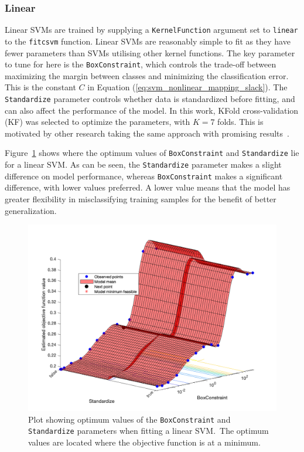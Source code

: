 \subsubsection{Linear}

Linear SVMs are trained by supplying a \texttt{KernelFunction} argument set to
\texttt{linear} to the \texttt{fitcsvm} function. Linear SVMs are reasonably
simple to fit as they have fewer parameters than SVMs utilising other kernel
functions. The key parameter to tune for here is the \texttt{BoxConstraint},
which controls the trade-off between maximizing the margin between classes and
minimizing the classification error. This is the constant $C$ in Equation
(\ref{eq:svm_nonlinear_mapping_slack}). The \texttt{Standardize} parameter
controls whether data is standardized before fitting, and can also affect the
performance of the model. In this work, KFold cross-validation (KF) was selected
to optimize the parameters, with $K=7$ folds. This is motivated by other
research taking the same approach with promising
results~\cite{ramashini2022robust}.

Figure~\ref{fig:linear_optim} shows where the optimum values of
\texttt{BoxConstraint} and \texttt{Standardize} lie for a linear SVM\@. As can
be seen, the \texttt{Standardize} parameter makes a slight difference on model
performance, whereas \texttt{BoxConstraint} makes a significant difference, with
lower values preferred. A lower value means that the model has greater
flexibility in misclassifying training samples for the benefit of better
generalization.

\begin{figure}[ht]
  \centering
  \includegraphics[width=\textwidth]{figures/linear_optim.png}
  \caption{Plot showing optimum values of the \texttt{BoxConstraint} and
  \texttt{Standardize} parameters when fitting a linear SVM.\ The optimum values
are located where the objective function is at a
minimum.}\label{fig:linear_optim}
\end{figure}

